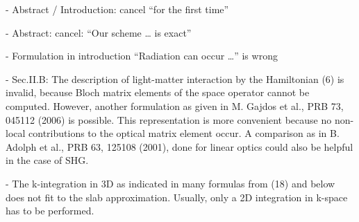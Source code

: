 - Abstract / Introduction: cancel “for the first time” 

- Abstract: cancel: “Our scheme … is exact” 

- Formulation in introduction “Radiation can occur …” is wrong 

- Sec.II.B: The description of light-matter interaction by the 
Hamiltonian (6) is invalid, because Bloch matrix elements of the space 
operator cannot be computed. However, another formulation as given in 
M. Gajdos et al., PRB 73, 045112 (2006) is possible. This 
representation is more convenient because no non-local contributions 
to the optical matrix element occur. A comparison as in B. Adolph et 
al., PRB 63, 125108 (2001), done for linear optics could also be 
helpful in the case of SHG. 

- The k-integration in 3D as indicated in many formulas from (18) and 
below does not fit to the slab approximation. Usually, only a 2D 
integration in k-space has to be performed.
